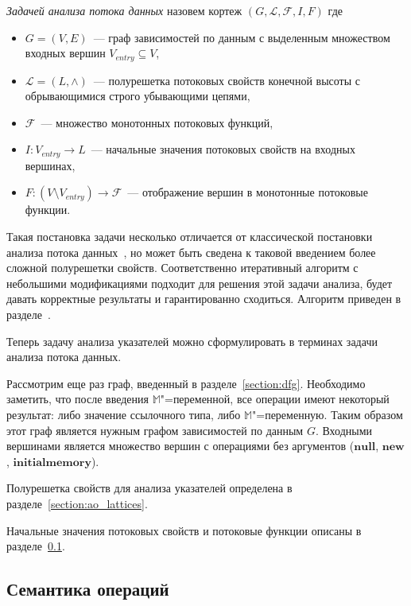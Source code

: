 \documentclass[14pt,titlepage,draft]{extarticle}
\newcommand{\M}{\ensuremath{\mathbb{M}}}
\newcommand{\op}[1]{\mathbf{#1}}
\newcommand{\Lattice}{\mathcal{L}}
\newcommand{\meet}{\wedge}
\begin{document}
    \emph{Задачей анализа потока данных} назовем кортеж $(G, \Lattice,
    \mathcal{F}, I, F)$ где
    \begin{itemize}
      \item $G = (V, E)$~--- граф зависимостей по данным с выделенным
            множеством входных вершин $V_{entry} \subseteq V$,
      \item $\Lattice = (L, \meet)$~--- полурешетка потоковых свойств конечной
            высоты с обрывающимися строго убывающими цепями,
      \item $\mathcal{F}$~--- множество монотонных потоковых функций,
      \item $I\colon V_{entry} \to L$~--- начальные значения потоковых свойств
            на входных вершинах,
      \item $F\colon (V \setminus V_{entry}) \to \mathcal{F}$~--- отображение
            вершин в монотонные потоковые функции.
    \end{itemize}

    Такая постановка задачи несколько отличается от классической постановки
    анализа потока данных~\cite{muchnick, nielson}, но может быть сведена к
    таковой введением более сложной полурешетки свойств.
    Соответственно итеративный алгоритм с небольшими модификациями подходит для
    решения этой задачи анализа, будет давать корректные результаты и
    гарантированно сходиться. Алгоритм приведен в разделе~\todoref.

    Теперь задачу анализа указателей можно сформулировать в терминах задачи
    анализа потока данных.

    Рассмотрим еще раз граф, введенный в разделе~\ref{section:dfg}.
    Необходимо заметить, что после введения \M"=переменной, все операции имеют
    некоторый результат: либо значение ссылочного типа, либо \M"=переменную.
    Таким образом этот граф является нужным графом зависимостей по данным $G$.
    Входными вершинами является множество вершин с операциями без аргументов
    ($\op{null}$, $\op{new}$, $\op{initialmemory}$).

    Полурешетка свойств для анализа указателей определена в
    разделе~\ref{section:ao_lattices}.

    Начальные значения потоковых свойств и потоковые функции описаны
    в разделе~\ref{section:flow_functions}.

  \subsection{Семантика операций}
    \label{section:flow_functions}
\end{document}
